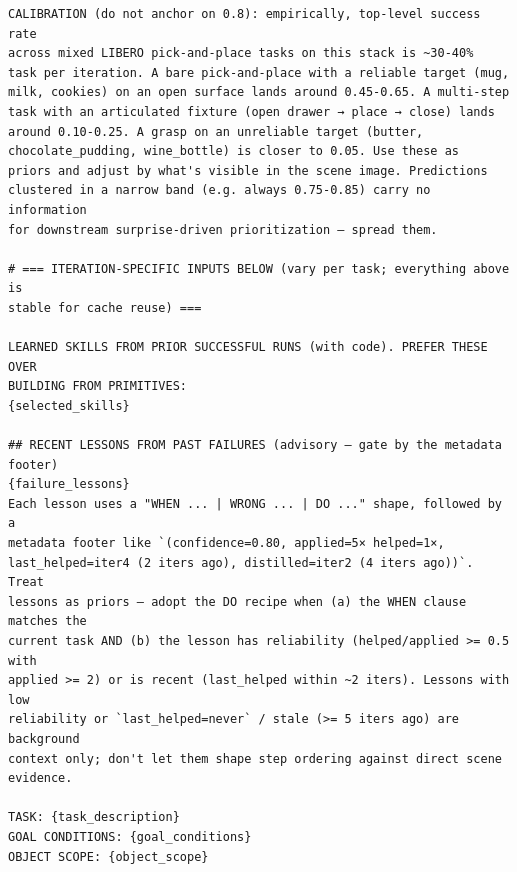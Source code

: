 \documentclass{llmxive}
\begin{document}
\begin{lstlisting}[style=ratsappendixprompt]
CALIBRATION (do not anchor on 0.8): empirically, top-level success rate
across mixed LIBERO pick-and-place tasks on this stack is ~30-40%
task per iteration. A bare pick-and-place with a reliable target (mug,
milk, cookies) on an open surface lands around 0.45-0.65. A multi-step
task with an articulated fixture (open drawer → place → close) lands
around 0.10-0.25. A grasp on an unreliable target (butter,
chocolate_pudding, wine_bottle) is closer to 0.05. Use these as
priors and adjust by what's visible in the scene image. Predictions
clustered in a narrow band (e.g. always 0.75-0.85) carry no information
for downstream surprise-driven prioritization — spread them.

# === ITERATION-SPECIFIC INPUTS BELOW (vary per task; everything above is
stable for cache reuse) ===

LEARNED SKILLS FROM PRIOR SUCCESSFUL RUNS (with code). PREFER THESE OVER
BUILDING FROM PRIMITIVES:
{selected_skills}

## RECENT LESSONS FROM PAST FAILURES (advisory — gate by the metadata
footer)
{failure_lessons}
Each lesson uses a "WHEN ... | WRONG ... | DO ..." shape, followed by a
metadata footer like `(confidence=0.80, applied=5× helped=1×,
last_helped=iter4 (2 iters ago), distilled=iter2 (4 iters ago))`. Treat
lessons as priors — adopt the DO recipe when (a) the WHEN clause matches the
current task AND (b) the lesson has reliability (helped/applied >= 0.5 with
applied >= 2) or is recent (last_helped within ~2 iters). Lessons with low
reliability or `last_helped=never` / stale (>= 5 iters ago) are background
context only; don't let them shape step ordering against direct scene
evidence.

TASK: {task_description}
GOAL CONDITIONS: {goal_conditions}
OBJECT SCOPE: {object_scope}
\end{lstlisting}
\end{document}
